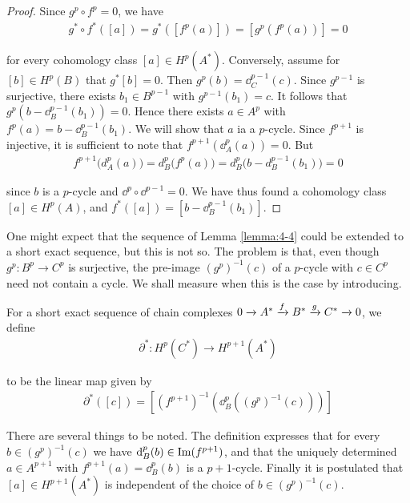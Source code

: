 \begin{proof}
  Since $g^p\circ f^p=0$, we have
  \begin{align*}
    g^*\circ f^*([ a ])=g^*([f^p(a)])=[g^p(f^p(a))]=0
  \end{align*}

  for every cohomology class $[a]\in H^p(A^*)$. Conversely, assume for $[b]\in H^p(B)$ that
  $g^*[b] = 0$. Then $g^p(b) = \dd^{p-1}_C(c)$. Since $g^{p-1}$ is surjective, there exists
  $b_1\in B^{p-1}$ with $g^{p-1}(b_1) = c$. It follows that $g^p(b-\dd^{p-1}_B(b_1)) = 0$. Hence
  there exists $a\in A^p$ with $f^p(a) = b-\dd^{p-1}_B(b_1)$. We will show that $a$ ia a $p$-cycle.
  Since $f^{p+1}$ is injective, it is sufficient to note that $f^{p+1}(\!\dd^p_A(a)) = 0$. But
  \begin{align*}
    f^{p+1}\big(d_A^p(a)\big)=d_B^p\big(f^p(a)\big)=d_B^p\big(b-d_B^{p-1}(b_1)\big) = 0
  \end{align*}

  since $b$ is a $p$-cycle and $\dd^p\circ\dd^{p-1} = 0$. We have thus found a cohomology class
  $[a]\in H^p(A)$, and $f^*([a]) = [b - \dd^{p-1}_B(b_1)]$.
\end{proof}


One might expect that the sequence of Lemma \ref{lemma:4-4} could be extended to a short
exact sequence, but this is not so. The problem is that, even though $g^p:B^p\to C^p$
is surjective, the pre-image $(g^p)^{-1}(c)$ of a $p$-cycle with $c\in C^p$ need not contain
a cycle. We shall measure when this is the case by introducing.


\begin{definition}\label{definition:4-5}
  For a short exact sequence of chain complexes $0\xra[]A^*\xra[f]B^*\xra[g]C^*\xra[]0$, we define
  \begin{align*}
    \partial^*: H^p(C^*) \to H^{p+1}(A^*)
  \end{align*}

  to be the linear map given by
  \begin{align*}
    \partial^*([c]) = \left[\left(f^{p+1}\right)^{-1} \left(\!\dd^p_B\left((g^p)^{-1}(c)\right)\right)\right]
  \end{align*}
\end{definition}

There are several things to be noted. The definition expresses that for every $b\in (g^p)^{-1}(c)$ we have
$\dd^p_B(b)\in\im(f^{p+1})$, and that the uniquely determined $a\in A^{p+1}$ with $f^{p+1}(a) = \dd^p_B(b)$ is a
$p+1$-cycle. Finally it is postulated that $[a]\in H^{p+1}(A^*)$ is independent of the choice of $b\in (g^p)^{-1}(c)$.

